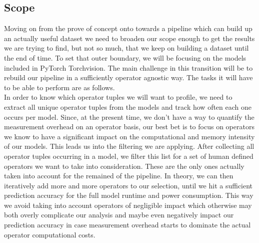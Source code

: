 \documentclass[conference]{IEEEtran}
\begin{document}
\subsection{Scope}
Moving on from the prove of concept onto towards a pipeline which can build up an actually useful dataset we need to broaden our scope enough to get the results we are trying to find, but not so much, that we keep on building a dataset until the end of time. 
To set that outer boundary, we will be focusing on the models included in PyTorch Torchvision. The main challenge in this transition will be to rebuild our pipeline in a sufficiently operator agnostic way. The tasks it will have to be able to perform are as follows. \\
In order to know which operator tuples we will want to profile, we need to extract all unique operator tuples from the models and track how often each one occurs per model. Since, at the present time, we don’t have a way to quantify the measurement overhead on an operator basis, our best bet is to focus on operators we know to have a significant impact on the computational and memory intensity of our models. This leads us into the filtering we are applying. After collecting all operator tuples occurring in a model, we filter this list for a set of human defined operators we want to take into consideration. These are the only ones actually taken into account for the remained of the pipeline. In theory, we can then iteratively add more and more operators to our selection, until we hit a sufficient prediction accuracy for the full model runtime and power consumption.  This way we avoid taking into account operators of negligible impact which otherwise may both overly complicate our analysis and maybe even negatively impact our prediction accuracy in case measurement overhead starts to dominate the actual operator computational costs. 
\end{document}
